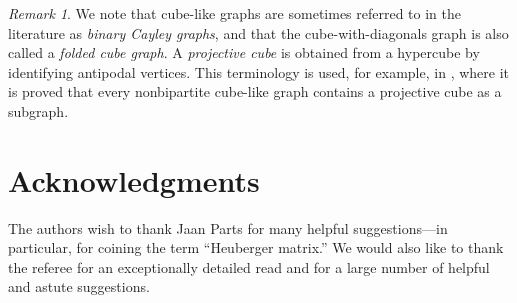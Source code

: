 \documentclass{article}
\theoremstyle{definition}
\theoremstyle{remark}
\newtheorem{Rmk}[Thm]{Remark}
\begin{document}
\begin{Rmk}We note that cube-like graphs are sometimes referred to in the literature as \emph{binary Cayley graphs}, and that the cube-with-diagonals graph is also called a \emph{folded cube graph}.  A \emph{projective cube} is obtained from a hypercube by identifying antipodal vertices.  This terminology is used, for example, in \cite{Beaudou-Naserasr-Tardif}, where it is proved that every nonbipartite cube-like graph contains a projective cube as a subgraph.\end{Rmk}

\section*{Acknowledgments}

The authors wish to thank Jaan Parts for many helpful suggestions---in particular, for coining the term ``Heuberger matrix.''  We would also like to thank the referee for an exceptionally detailed read and for a large number of helpful and astute suggestions.
\end{document}
